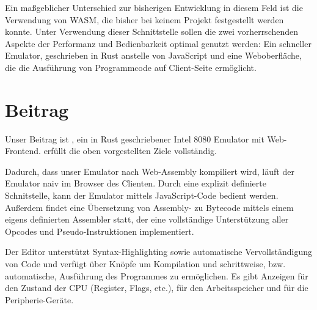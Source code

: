 Ein maßgeblicher Unterschied zur bisherigen Entwicklung in diesem Feld ist die Verwendung von \ac{WASM}, die bisher bei keinem Projekt festgestellt werden konnte. Unter Verwendung dieser Schnittstelle sollen die zwei vorherrschenden Aspekte der Performanz und Bedienbarkeit optimal genutzt werden: Ein schneller Emulator, geschrieben in Rust anstelle von JavaScript und eine Weboberfläche, die die Ausführung von Programmcode auf Client-Seite ermöglicht.

\section{Beitrag}

Unser Beitrag ist \Emu, ein in Rust geschriebener Intel 8080 Emulator mit Web-Frontend. \Emu{} erfüllt die oben vorgestellten Ziele vollständig.

Dadurch, dass unser Emulator nach Web-Assembly kompiliert wird, läuft der Emulator naiv im Browser des Clienten. Durch eine explizit definierte Schnitstelle, kann der Emulator mittels JavaScript-Code bedient werden. Außerdem findet eine Übersetzung von Assembly- zu Bytecode mittels einem eigens definierten Assembler statt, der eine vollständige Unterstützung aller Opcodes und Pseudo-Instruktionen implementiert.

Der Editor unterstützt Syntax-Highlighting sowie automatische Vervollständigung von Code und verfügt über Knöpfe um Kompilation und schrittweise, bzw. automatische, Ausführung des Programmes zu ermöglichen.
Es gibt Anzeigen für den Zustand der CPU (Register, Flags, etc.), für den Arbeitsspeicher und für die Peripherie-Geräte.\\
